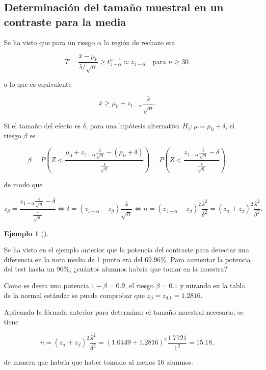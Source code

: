 \documentclass[
  spanish,
  a4paper,
]{scrreport}
\theoremstyle{plain}
\theoremstyle{definition}
\newtheorem{example}{Ejemplo}[chapter]
\theoremstyle{definition}
\theoremstyle{remark}
\begin{document}
\subsection{Determinación del tamaño muestral en un contraste para la
media}\label{determinaciuxf3n-del-tamauxf1o-muestral-en-un-contraste-para-la-media}

Se ha visto que para un riesgo \(\alpha\) la región de rechazo era

\[
T=\frac{\bar x-\mu_0}{\hat s/\sqrt{n}} \geq t^{n-1}_{1-\alpha} \approx z_{1-\alpha}\quad \mbox{para } n\geq 30.
\]

o lo que es equivalente

\[
\bar x \geq \mu_0+z_{1-\alpha}\frac{\hat s}{\sqrt n}.
\]

Si el tamaño del efecto es \(\delta\), para una hipótesis alternativa
\(H_1:\mu=\mu_0+\delta\), el riesgo \(\beta\) es

\[
\beta = P\left(Z< \frac{\mu_0+z_{1-\alpha}\frac{\hat s}{\sqrt n}-(\mu_0+\delta)}{\frac{\hat s}{\sqrt n}} \right) = P\left(Z< \frac{z_{1-\alpha}\frac{\hat s}{\sqrt n}-\delta}{\frac{\hat s}{\sqrt n}} \right).
\]

de modo que

\[
z_\beta = \frac{z_{1-\alpha}\frac{\hat s}{\sqrt n}-\delta}{\frac{\hat s}{\sqrt n}} \Leftrightarrow \delta = (z_{1-\alpha}-z_\beta)\frac{\hat s}{\sqrt n} \Leftrightarrow n = (z_{1-\alpha}-z_\beta)^2\frac{\hat s^2}{\delta^2} = (z_\alpha+z_\beta)^2\frac{\hat s^2}{\delta^2}.
\]

\begin{example}[]\protect\hypertarget{exm-tamaño-muestral-contraste-media}{}\label{exm-tamaño-muestral-contraste-media}

Se ha visto en el ejemplo anterior que la potencia del contraste para
detectar una diferencia en la nota media de 1 punto era del \(69.96%
\)\%. Para aumentar la potencia del test hasta un \(90\)\%, ¿cuántos
alumnos habría que tomar en la muestra?

Como se desea una potencia \(1-\beta=0.9\), el riesgo \(\beta=0.1\) y
mirando en la tabla de la normal estándar se puede comprobar que
\(z_\beta = z_{0.1}=1.2816\).

Aplicando la fórmula anterior para determinar el tamaño muestral
necesario, se tiene

\[
n = (z_\alpha+z_\beta)^2\frac{\hat s^2}{\delta^2} = (1.6449+1.2816)^2\frac{1.7721}{1^2} = 15.18,
\]

de manera que habría que haber tomado al menos 16 alumnos.

\end{example}
\end{document}
